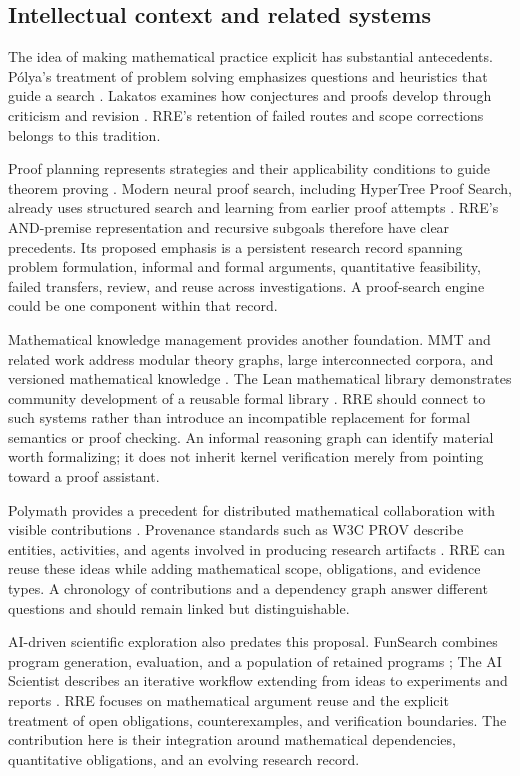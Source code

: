 \subsection{Intellectual context and related systems}

The idea of making mathematical practice explicit has substantial antecedents. P\'olya's treatment of problem solving emphasizes questions and heuristics that guide a search \cite{polya}. Lakatos examines how conjectures and proofs develop through criticism and revision \cite{lakatos}. RRE's retention of failed routes and scope corrections belongs to this tradition.

Proof planning represents strategies and their applicability conditions to guide theorem proving \cite{bundy}. Modern neural proof search, including HyperTree Proof Search, already uses structured search and learning from earlier proof attempts \cite{htps}. RRE's AND-premise representation and recursive subgoals therefore have clear precedents. Its proposed emphasis is a persistent research record spanning problem formulation, informal and formal arguments, quantitative feasibility, failed transfers, review, and reuse across investigations. A proof-search engine could be one component within that record.

Mathematical knowledge management provides another foundation. MMT and related work address modular theory graphs, large interconnected corpora, and versioned mathematical knowledge \cite{mkm}. The Lean mathematical library demonstrates community development of a reusable formal library \cite{mathlib}. RRE should connect to such systems rather than introduce an incompatible replacement for formal semantics or proof checking. An informal reasoning graph can identify material worth formalizing; it does not inherit kernel verification merely from pointing toward a proof assistant.

Polymath provides a precedent for distributed mathematical collaboration with visible contributions \cite{polymath}. Provenance standards such as W3C PROV describe entities, activities, and agents involved in producing research artifacts \cite{prov}. RRE can reuse these ideas while adding mathematical scope, obligations, and evidence types. A chronology of contributions and a dependency graph answer different questions and should remain linked but distinguishable.

AI-driven scientific exploration also predates this proposal. FunSearch combines program generation, evaluation, and a population of retained programs \cite{funsearch}; The AI Scientist describes an iterative workflow extending from ideas to experiments and reports \cite{aiscientist}. RRE focuses on mathematical argument reuse and the explicit treatment of open obligations, counterexamples, and verification boundaries. The contribution here is their integration around mathematical dependencies, quantitative obligations, and an evolving research record.


